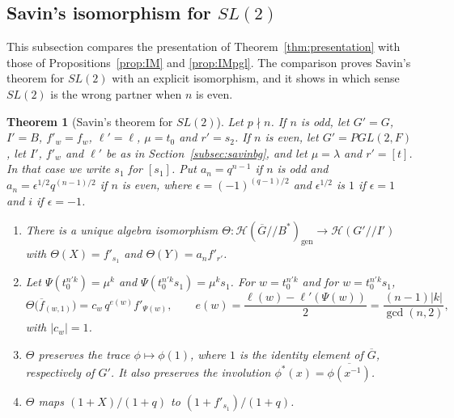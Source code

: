 \documentclass[12pt,letterpaper]{amsart}
\numberwithin{equation}{section}
\newtheorem{theorem}{Theorem}[section]
\theoremstyle{definition}
\theoremstyle{remark}
\newcommand{\cH}{\mathcal{H}}
\newcommand{\Gbar}{\overline{G}}
\newcommand{\gen}{\mathrm{gen}}
\newcommand{\fbar}{\overline{f}}
\begin{document}
\subsection{Savin's isomorphism for \texorpdfstring{$SL(2)$}{SL(2)}}
This subsection compares the presentation of
Theorem~\ref{thm:presentation} with those of
Propositions~\ref{prop:IM} and \ref{prop:IMpgl}. The comparison proves
Savin's theorem for $SL(2)$ with an explicit isomorphism, and it shows
in which sense $SL(2)$ is the wrong partner when $n$ is even.

\begin{theorem}[Savin's theorem for $SL(2)$]
\label{thm:savinsl2}
Let $p\nmid n$. If $n$ is odd, let $G'=G$, $I'=B$, $f'_w=f_w$,
$\ell'=\ell$, $\mu=t_0$ and $r'=s_2$. If $n$ is even, let
$G'=PGL(2,F)$, let $I'$, $f'_w$ and $\ell'$ be as in
Section~\ref{subsec:savinbg}, and let $\mu=\lambda$ and $r'=[t]$. In
that case we write $s_1$ for $[s_1]$. Put $a_n=q^{n-1}$ if $n$ is odd
and $a_n=\epsilon^{1/2}q^{(n-1)/2}$ if $n$ is even, where
$\epsilon=(-1)^{(q-1)/2}$ and $\epsilon^{1/2}$ is $1$ if $\epsilon=1$
and $i$ if $\epsilon=-1$.
\begin{enumerate}[leftmargin=2em,label=(\alph*)]
\item There is a unique algebra isomorphism
$\Theta:\cH(\Gbar/\!/B^*)_{\gen}\to\cH(G'/\!/I')$ with
$\Theta(X)=f'_{s_1}$ and $\Theta(Y)=a_nf'_{r'}$.
\item Let $\Psi(t_0^{n'k})=\mu^k$ and $\Psi(t_0^{n'k}s_1)=\mu^ks_1$.
For $w=t_0^{n'k}$ and for $w=t_0^{n'k}s_1$,
\[
\Theta\bigl(\fbar_{(w,1)}\bigr)=c_w\,q^{e(w)}f'_{\Psi(w)},\qquad
e(w)=\frac{\ell(w)-\ell'(\Psi(w))}{2}=\frac{(n-1)|k|}{\gcd(n,2)},
\]
with $|c_w|=1$.
\item $\Theta$ preserves the trace $\phi\mapsto\phi(1)$, where $1$ is
the identity element of $\Gbar$, respectively of $G'$. It also
preserves the involution $\phi^*(x)=\overline{\phi(x^{-1})}$.
\item $\Theta$ maps $(1+X)/(1+q)$ to $(1+f'_{s_1})/(1+q)$.
\end{enumerate}
\end{theorem}
\end{document}
